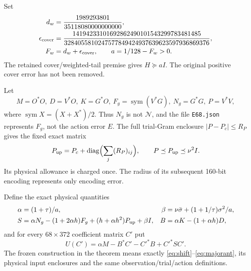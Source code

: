 \documentclass[11pt,a4paper]{article}
\newcommand{\NN}{\mathcal N}
\newcommand{\sym}{\operatorname{sym}}
\newcommand{\diag}{\operatorname{diag}}
\theoremstyle{definition}
\theoremstyle{remark}
\numberwithin{equation}{section}
\begin{document}
Set
\begin{align}
 d_w&=\frac{1989293801}{35118080000000000},\notag\\
 \epsilon_{\rm cover}
 &=\frac{14194233101692862490101543299783481485}
 {3284055810247577849424937639623597936869376},\notag\\
 F_w&=d_w+\epsilon_{\rm cover},\qquad a=1/128-F_w>0.
\end{align}
The retained cover/weighted-tail premise gives $H\succeq aI$.
The original positive cover error has not been removed.

Let
\begin{equation}
 M=O^*O,\ D=V^*O,\ K=G^*O,\ F_g=\sym(V^*G),\
 N_g=G^*G,\ P=V^*V,
\end{equation}
where $\sym X=(X+X^*)/2$. Thus $N_g$ is not $\NN$, and the file
\texttt{E68.json} represents $F_g$, not the action error $E$.
The full trial-Gram enclosure $|P-P_c|\le R_P$ gives the fixed exact matrix
\begin{equation}\label{eq:pup}
 P_{\rm up}=P_c+\diag\Bigl(\sum_j(R_P)_{ij}\Bigr),
 \qquad P\preceq P_{\rm up}\preceq\nu^2 I.
\end{equation}
Its physical allowance is charged once. The radius of its subsequent
160-bit encoding represents only encoding error.

Define the exact physical quantities
\begin{align}\label{eq:normal}
 \alpha&=(1+\tau)/a,&
 \beta&=\nu\bar\sigma+(1+1/\tau)\sigma^2/a,\notag\\
 S&=\alpha N_g-(1+2\alpha h)F_g+(h+\alpha h^2)P_{\rm up}+\beta I,&
 B&=\alpha K-(1+\alpha h)D,
\end{align}
and for every $68\times372$ coefficient matrix $C'$ put
\begin{equation}\label{eq:majorant}
 U(C')=\alpha M-B^*C'-C'^*B+C'^*SC'.
\end{equation}
The frozen construction in the theorem means exactly
\eqref{eq:shift}--\eqref{eq:majorant}, its physical input enclosures and
the same observation/trial/action definitions.
\end{document}
